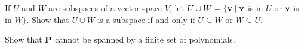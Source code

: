 \begin{multicols}{2}
\begin{ex}
\begin{enumerate}[label={\alph*.}]
\end{enumerate}
\end{ex}

\begin{ex}
If $U$ and $W$ are subspaces of a vector space $V$, let 
$U \cup W = \{\textbf{v} \mid \textbf{v}$ is in $U$ or $\textbf{v}$ is in $W\}$. Show that $U \cup W$ is a subspace if and only if $U \subseteq W$ or $W \subseteq U$.
\end{ex}

\begin{ex}
Show that $\textbf{P}$ cannot be spanned by a finite set of polynomials.
\end{ex}
\end{multicols}
